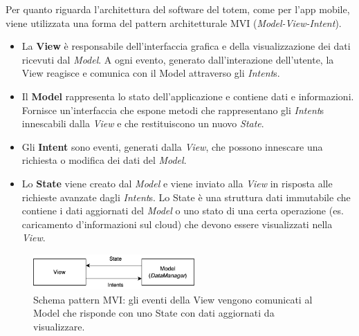 Per quanto riguarda l'architettura del software del totem, come per l'app mobile, viene utilizzata una forma del pattern architetturale MVI (\textit{Model-View-Intent}).
\begin{itemize}
    \item La \textbf{View} è responsabile dell'interfaccia grafica e della visualizzazione dei dati ricevuti dal \textit{Model}. A ogni evento, generato dall'interazione dell'utente, la View reagisce e comunica con il Model attraverso gli \textit{Intent}s.
    \item Il \textbf{Model} rappresenta lo stato dell'applicazione e contiene dati e informazioni. Fornisce un'interfaccia che espone metodi che rappresentano gli \textit{Intent}s innescabili dalla \textit{View} e che restituiscono un nuovo \textit{State}.
    \item Gli \textbf{Intent} sono eventi, generati dalla \textit{View}, che possono innescare una richiesta o modifica dei dati del \textit{Model}.
    \item Lo \textbf{State} viene creato dal \textit{Model} e viene inviato alla \textit{View} in risposta alle richieste avanzate dagli \textit{Intent}s. Lo State è una struttura dati immutabile che contiene i dati aggiornati del \textit{Model} o uno stato di una certa operazione (es. caricamento d'informazioni sul cloud) che devono essere visualizzati nella \textit{View}.
\end{itemize}
\begin{figure}[h!]
    \centering
    \includegraphics[width=0.55\textwidth]{img/totem/mvi-schema.png}
    \caption[Schema pattern MVI]{Schema pattern MVI: gli eventi della View vengono comunicati al Model che risponde con uno State con dati aggiornati da visualizzare.}
    \label{fig:mviPattern}
\end{figure}


